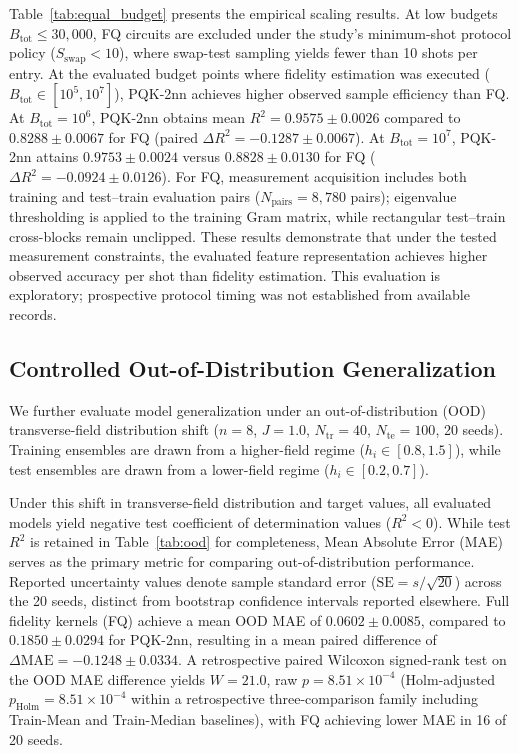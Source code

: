 \documentclass[conference]{IEEEtran}
\begin{document}
Table~\ref{tab:equal_budget} presents the empirical scaling results. At low budgets $B_{\mathrm{tot}} \le 30{,}000$, FQ circuits are excluded under the study's minimum-shot protocol policy ($S_{\mathrm{swap}} < 10$), where swap-test sampling yields fewer than 10 shots per entry. At the evaluated budget points where fidelity estimation was executed ($B_{\mathrm{tot}} \in [10^5, 10^7]$), PQK-2nn achieves higher observed sample efficiency than FQ. At $B_{\mathrm{tot}}=10^6$, PQK-2nn obtains mean $R^2 = 0.9575 \pm 0.0026$ compared to $0.8288 \pm 0.0067$ for FQ (paired $\Delta R^2 = -0.1287 \pm 0.0067$). At $B_{\mathrm{tot}}=10^7$, PQK-2nn attains $0.9753 \pm 0.0024$ versus $0.8828 \pm 0.0130$ for FQ ($\Delta R^2 = -0.0924 \pm 0.0126$). For FQ, measurement acquisition includes both training and test--train evaluation pairs ($N_{\mathrm{pairs}}=8{,}780$ pairs); eigenvalue thresholding is applied to the training Gram matrix, while rectangular test--train cross-blocks remain unclipped. These results demonstrate that under the tested measurement constraints, the evaluated feature representation achieves higher observed accuracy per shot than fidelity estimation. This evaluation is exploratory; prospective protocol timing was not established from available records.



\subsection{Controlled Out-of-Distribution Generalization}
\label{sec:ood}
We further evaluate model generalization under an out-of-distribution (OOD) transverse-field distribution shift ($n=8$, $J=1.0$, $N_{\mathrm{tr}}=40$, $N_{\mathrm{te}}=100$, 20 seeds). Training ensembles are drawn from a higher-field regime ($h_i \in [0.8, 1.5]$), while test ensembles are drawn from a lower-field regime ($h_i \in [0.2, 0.7]$).

Under this shift in transverse-field distribution and target values, all evaluated models yield negative test coefficient of determination values ($R^2 < 0$). While test $R^2$ is retained in Table~\ref{tab:ood} for completeness, Mean Absolute Error (MAE) serves as the primary metric for comparing out-of-distribution performance. Reported uncertainty values denote sample standard error ($\mathrm{SE} = s/\sqrt{20}$) across the 20 seeds, distinct from bootstrap confidence intervals reported elsewhere. Full fidelity kernels (FQ) achieve a mean OOD MAE of $0.0602 \pm 0.0085$, compared to $0.1850 \pm 0.0294$ for PQK-2nn, resulting in a mean paired difference of $\Delta\mathrm{MAE} = -0.1248 \pm 0.0334$. A retrospective paired Wilcoxon signed-rank test on the OOD MAE difference yields $W=21.0$, raw $p=8.51\times 10^{-4}$ (Holm-adjusted $p_{\mathrm{Holm}}=8.51\times 10^{-4}$ within a retrospective three-comparison family including Train-Mean and Train-Median baselines), with FQ achieving lower MAE in 16 of 20 seeds.
\end{document}
